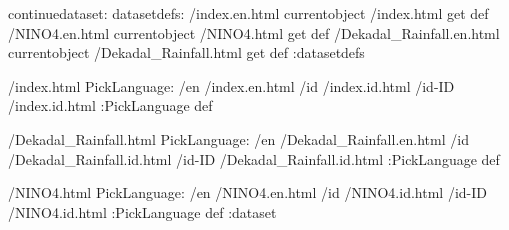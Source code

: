 \begin{ingrid}
continuedataset:
datasetdefs:
/index.en.html currentobject /index.html get def
/NINO4.en.html currentobject /NINO4.html get def
/Dekadal_Rainfall.en.html currentobject /Dekadal_Rainfall.html get def
:datasetdefs

/index.html {
PickLanguage:
/en /index.en.html
/id /index.id.html
/id-ID /index.id.html
:PickLanguage
} def

/Dekadal_Rainfall.html {
PickLanguage:
/en /Dekadal_Rainfall.en.html
/id /Dekadal_Rainfall.id.html
/id-ID /Dekadal_Rainfall.id.html
:PickLanguage
} def

/NINO4.html {
PickLanguage:
/en /NINO4.en.html
/id /NINO4.id.html
/id-ID /NINO4.id.html
:PickLanguage
} def
:dataset
\end{ingrid}
